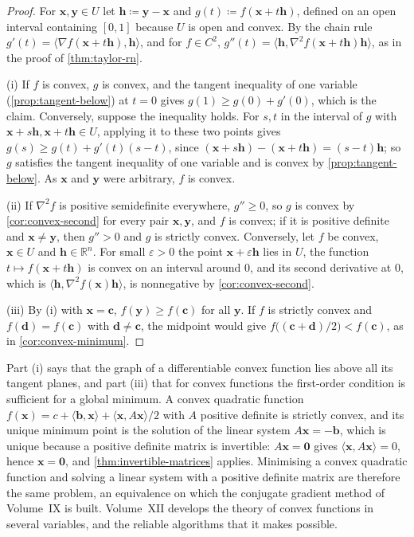 \begin{proof}
For $\mathbf x,\mathbf y\in U$ let $\mathbf h\coloneqq\mathbf y-\mathbf x$ and $g(t)\coloneqq f(\mathbf x+t\mathbf h)$, defined on an open interval containing $[0,1]$ because $U$ is open and convex. By the chain rule $g'(t)=\langle\nabla f(\mathbf x+t\mathbf h),\mathbf h\rangle$, and for $f\in C^2$, $g''(t)=\langle\mathbf h,\nabla^2f(\mathbf x+t\mathbf h)\mathbf h\rangle$, as in the proof of \cref{thm:taylor-rn}.

(i) If $f$ is convex, $g$ is convex, and the tangent inequality of one variable (\cref{prop:tangent-below}) at $t=0$ gives $g(1)\ge g(0)+g'(0)$, which is the claim. Conversely, suppose the inequality holds. For $s,t$ in the interval of $g$ with $\mathbf x+s\mathbf h,\mathbf x+t\mathbf h\in U$, applying it to these two points gives $g(s)\ge g(t)+g'(t)(s-t)$, since $(\mathbf x+s\mathbf h)-(\mathbf x+t\mathbf h)=(s-t)\mathbf h$; so $g$ satisfies the tangent inequality of one variable and is convex by \cref{prop:tangent-below}. As $\mathbf x$ and $\mathbf y$ were arbitrary, $f$ is convex.

(ii) If $\nabla^2f$ is positive semidefinite everywhere, $g''\ge0$, so $g$ is convex by \cref{cor:convex-second} for every pair $\mathbf x,\mathbf y$, and $f$ is convex; if it is positive definite and $\mathbf x\ne\mathbf y$, then $g''>0$ and $g$ is strictly convex. Conversely, let $f$ be convex, $\mathbf x\in U$ and $\mathbf h\in\mathbb R^n$. For small $\varepsilon>0$ the point $\mathbf x+\varepsilon\mathbf h$ lies in $U$, the function $t\mapsto f(\mathbf x+t\mathbf h)$ is convex on an interval around $0$, and its second derivative at $0$, which is $\langle\mathbf h,\nabla^2f(\mathbf x)\mathbf h\rangle$, is nonnegative by \cref{cor:convex-second}.

(iii) By (i) with $\mathbf x=\mathbf c$, $f(\mathbf y)\ge f(\mathbf c)$ for all $\mathbf y$. If $f$ is strictly convex and $f(\mathbf d)=f(\mathbf c)$ with $\mathbf d\ne\mathbf c$, the midpoint would give $f\bigl((\mathbf c+\mathbf d)/2\bigr)<f(\mathbf c)$, as in \cref{cor:convex-minimum}.
\end{proof}

Part (i) says that the graph of a differentiable convex function lies above all its tangent planes, and part (iii) that for convex functions the first-order condition is sufficient for a global minimum. A convex quadratic function $f(\mathbf x)=c+\langle\mathbf b,\mathbf x\rangle+\langle\mathbf x,A\mathbf x\rangle/2$ with $A$ positive definite is strictly convex, and its unique minimum point is the solution of the linear system $A\mathbf x=-\mathbf b$, which is unique because a positive definite matrix is invertible: $A\mathbf x=\mathbf0$ gives $\langle\mathbf x,A\mathbf x\rangle=0$, hence $\mathbf x=\mathbf0$, and \cref{thm:invertible-matrices} applies. Minimising a convex quadratic function and solving a linear system with a positive definite matrix are therefore the same problem, an equivalence on which the conjugate gradient method of Volume~IX is built. Volume~XII develops the theory of convex functions in several variables, and the reliable algorithms that it makes possible.

